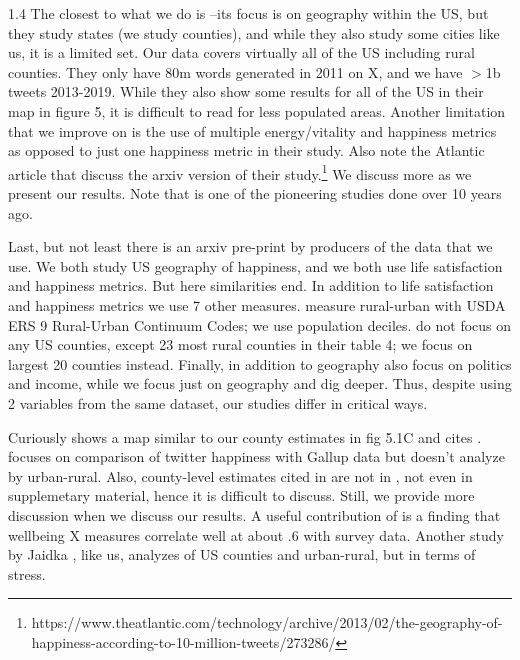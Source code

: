 \documentclass[10pt, letterpaper]{article}
\begin{document}
\begin{spacing}{1.4}
The closest to what we do is \citet{mitchell13}--its focus is on geography
within the US, but they study states (we study counties), and while they also
study some cities like us, it is a limited set.  Our data covers virtually all
of the US including rural counties. They only have 80m words generated in 2011
on X, and we have $>$1b tweets 2013-2019.  While they also show
some results for all of the US in their map in figure 5, it
is difficult to read for less populated areas. Another limitation that we
improve on is the use of multiple energy/vitality and happiness metrics as
opposed to just one happiness metric in their study. 
Also note the Atlantic article that discuss the arxiv version of their study.\footnote{https://www.theatlantic.com/technology/archive/2013/02/the-geography-of-happiness-according-to-10-million-tweets/273286/}
We discuss \citet{mitchell13} more as we present our results. Note that
\citet{mitchell13} is one of the pioneering studies done over 10 years ago.

Last, but not least there is an arxiv pre-print \citep{iacus25} by producers of
the data that we use. We both study US geography of happiness, and we both use life
satisfaction and happiness metrics. But here similarities end.
In addition to
life satisfaction and happiness metrics we use 7 other measures.
 \citet{iacus25} measure rural-urban with USDA ERS 9 Rural-Urban Continuum Codes;
we use population deciles.
 \citet{iacus25} do not focus on any US counties, except 23 most rural counties
 in their table 4; we focus on largest 20 counties instead.
Finally, \citet{iacus25} in addition to geography also focus on politics and
income, while we focus just on geography and dig deeper.
Thus, despite using 2 variables from the same dataset, our studies differ in critical
ways.   

Curiously \citet{kjell2023towards} shows a map similar to our county estimates in fig 5.1C and cites \citet{jaidka2020estimating}. \citet{jaidka2020estimating} focuses on
 comparison of twitter happiness with Gallup data but doesn't
analyze by urban-rural. Also, county-level estimates cited in
\citet{kjell2023towards} are not in \citet{jaidka2020estimating}, not even in
 supplemetary material, hence it is difficult to discuss. %
Still, we provide more discussion when
 we discuss our results. A useful contribution of \citet{jaidka2020estimating} is a
finding that wellbeing X measures correlate well at about .6 with survey data.
 Another study by Jaidka \citep{jaidka2021rural}, like us,  analyzes of US
counties and urban-rural, but in terms of stress.


\end{spacing}
\end{document}
